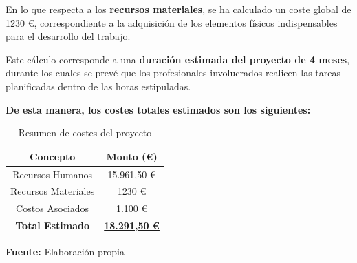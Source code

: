 \documentclass[a4paper, 10pt]{article}
\begin{document}
En lo que respecta a los \textbf{recursos materiales}, se ha calculado un coste global de \underline{1230 €}, correspondiente a la adquisición de los elementos físicos indispensables para el desarrollo del trabajo.  
\par\vspace{0.3cm}

Este cálculo corresponde a una \textbf{duración estimada del proyecto de 4 meses}, durante los cuales se prevé que los profesionales involucrados realicen las tareas planificadas dentro de las horas estipuladas.  

\par\vspace{0.5cm}
\textbf{De esta manera, los costes totales estimados son los siguientes:}  

\begin{table}[H]
\caption{Resumen de costes del proyecto}
\centering
\renewcommand{\arraystretch}{1.5}
\begin{tabular}{|c|c|}
\hline
\textbf{Concepto} & \textbf{Monto (€)} \\ \hline
Recursos Humanos & 15.961,50 € \\ \hline
Recursos Materiales & 1230 € \\ \hline
Costos Asociados & 1.100 € \\ \hline
\textbf{Total Estimado} & \underline{\textbf{18.291,50 €}} \\ \hline
\end{tabular}
\begin{flushleft}\centering
    \footnotesize \textbf{Fuente:} Elaboración propia
\end{flushleft}   
\label{tab:resumen_costes}
\end{table}



\clearpage































\par\vspace{0.5cm}
\end{document}
